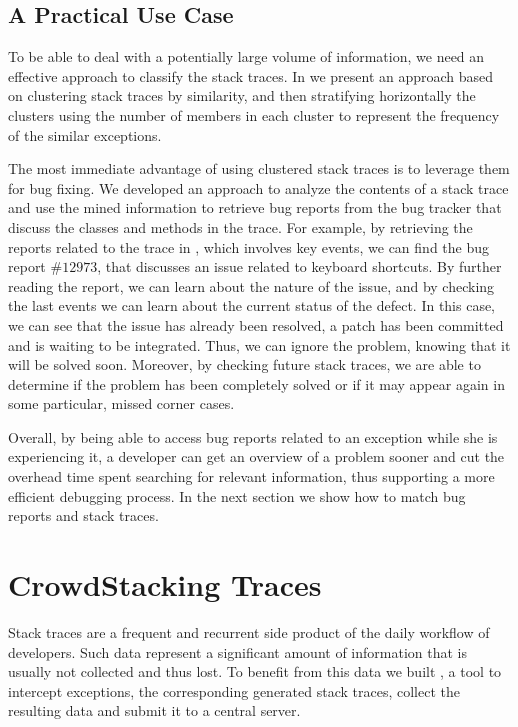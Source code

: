 \subsection{A Practical Use Case}

To be able to deal with a potentially large volume of information, we need an effective approach to classify the stack traces.
In  we present an approach based on clustering stack traces by similarity, and then stratifying horizontally the clusters using the number of members in each cluster to represent the frequency of the similar exceptions.

The most immediate advantage of using clustered stack traces is to leverage them for bug fixing.
We developed an approach to analyze the contents of a stack trace and use the mined information to retrieve bug reports from the \pha bug tracker that discuss the classes and methods in the trace.
For example, by retrieving the reports related to the trace in , which involves key events, we can find the bug report $\#12973$, that discusses an issue related to keyboard shortcuts.
By further reading the report, we can learn about the nature of the issue, and by checking the last events we can learn about the current status of the defect.
In this case, we can see that the issue has already been resolved, a patch has been committed and is waiting to be integrated.
Thus, we can ignore the problem, knowing that it will be solved soon.
Moreover, by checking future stack traces, we are able to determine if the problem has been completely solved or if it may appear again in some particular, missed corner cases.

Overall, by being able to access bug reports related to an exception while she is experiencing it, a developer can get an overview of a problem sooner and cut the overhead time spent searching for relevant information, thus supporting a more efficient debugging process.
In the next section we show how to match bug reports and stack traces.


\section{CrowdStacking Traces}\label{sec:stacktraces-dataset}

Stack traces are a frequent and recurrent side product of the daily workflow of developers.
Such data represent a significant amount of information that is usually not collected and thus lost.
To benefit from this data we built \slr, a tool to intercept exceptions, the corresponding generated stack traces, collect the resulting data and submit it to a central server.



